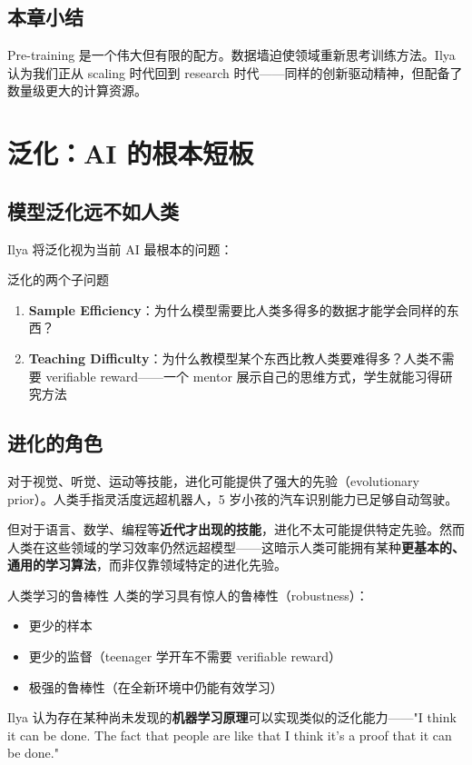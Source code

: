 \documentclass[a4paper]{article}
\begin{document}
\subsection{本章小结}

Pre-training 是一个伟大但有限的配方。数据墙迫使领域重新思考训练方法。Ilya 认为我们正从 scaling 时代回到 research 时代——同样的创新驱动精神，但配备了数量级更大的计算资源。


\section{泛化：AI 的根本短板}

\subsection{模型泛化远不如人类}

Ilya 将泛化视为当前 AI 最根本的问题：

\begin{importantbox}{泛化的两个子问题}
\begin{enumerate}
    \item \textbf{Sample Efficiency}：为什么模型需要比人类多得多的数据才能学会同样的东西？
    \item \textbf{Teaching Difficulty}：为什么教模型某个东西比教人类要难得多？人类不需要 verifiable reward——一个 mentor 展示自己的思维方式，学生就能习得研究方法
\end{enumerate}
\end{importantbox}

\subsection{进化的角色}

对于视觉、听觉、运动等技能，进化可能提供了强大的先验（evolutionary prior）。人类手指灵活度远超机器人，5 岁小孩的汽车识别能力已足够自动驾驶。

但对于语言、数学、编程等\textbf{近代才出现的技能}，进化不太可能提供特定先验。然而人类在这些领域的学习效率仍然远超模型——这暗示人类可能拥有某种\textbf{更基本的、通用的学习算法}，而非仅靠领域特定的进化先验。

\begin{importantbox}{人类学习的鲁棒性}
人类的学习具有惊人的鲁棒性（robustness）：
\begin{itemize}
    \item 更少的样本
    \item 更少的监督（teenager 学开车不需要 verifiable reward）
    \item 极强的鲁棒性（在全新环境中仍能有效学习）
\end{itemize}
Ilya 认为存在某种尚未发现的\textbf{机器学习原理}可以实现类似的泛化能力——"I think it can be done. The fact that people are like that I think it's a proof that it can be done."
\end{importantbox}
\end{document}
